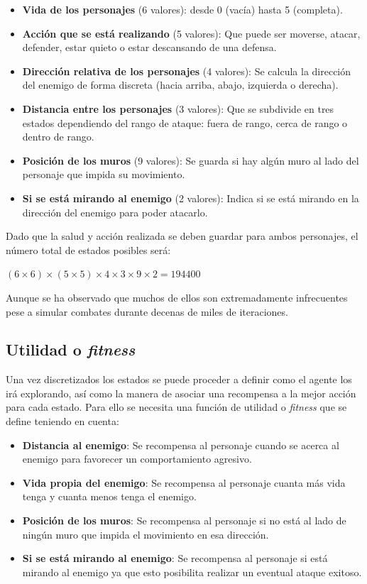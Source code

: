 \begin{itemize}
	\item \textbf{Vida de los personajes} (6 valores): desde 0 (vacía) hasta 5 (completa).
	\item \textbf{Acción que se está realizando} (5 valores): Que puede ser moverse, atacar, defender, estar quieto o estar descansando de una defensa.
	\item \textbf{Dirección relativa de los personajes} (4 valores): Se calcula la dirección del enemigo de forma discreta (hacia arriba, abajo, izquierda o derecha).
	\item \textbf{Distancia entre los personajes} (3 valores): Que se subdivide en tres estados dependiendo del rango de ataque: fuera de rango, cerca de rango o dentro de rango.
	\item \textbf{Posición de los muros} (9 valores): Se guarda si hay algún muro al lado del personaje que impida su movimiento.
	\item \textbf{Si se está mirando al enemigo} (2 valores): Indica si se está mirando en la dirección del enemigo para poder atacarlo.
\end{itemize}

Dado que la salud y acción realizada se deben guardar para ambos personajes, el número total de estados posibles será:
\bigskip

$(6\times6)\times(5\times5)\times4\times3\times9\times2=194400$

Aunque se ha observado que muchos de ellos son extremadamente infrecuentes pese a simular combates durante decenas de miles de iteraciones.



\subsection{Utilidad o \textit{fitness}}

Una vez discretizados los estados se puede proceder a definir como el agente los irá explorando, así como la manera de asociar una recompensa a la mejor acción para cada estado. Para ello se necesita una función de utilidad o \textit{fitness} que se define teniendo en cuenta:

\begin{itemize}
	\item \textbf{Distancia al enemigo}: Se recompensa al personaje cuando se acerca al enemigo para favorecer un comportamiento agresivo.
	\item \textbf{Vida propia del enemigo}: Se recompensa al personaje cuanta más vida tenga y cuanta menos tenga el enemigo.
	\item \textbf{Posición de los muros}: Se recompensa al personaje si no está al lado de ningún muro que impida el movimiento en esa dirección.
	\item \textbf{Si se está mirando al enemigo}: Se recompensa al personaje si está mirando al enemigo ya que esto posibilita realizar un eventual ataque exitoso.
\end{itemize}

